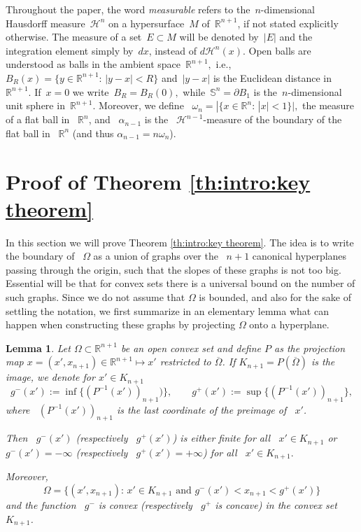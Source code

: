 \documentclass[reqno,12pt]{amsart}
\newcommand{\R}{\mathbb{R}}
\newcommand{\Haus}{\mathcal{H}}
\numberwithin{equation}{section}
\theoremstyle{plain}
\newtheorem{lemma}[definition]{Lemma}
\theoremstyle{definition}
\begin{document}
Throughout the paper, the word \emph{measurable} refers to the~$n$-dimensional Hausdorff measure~$\mathcal{H}^n$ on a hypersurface~$M$ of~$\R^{n+1}$, if not stated explicitly otherwise. The measure of a set~$E \subset M$ will be denoted by~$|E|$ and the integration element simply by~$dx$, instead of $d\Haus^n(x).$ Open balls are understood as balls in the ambient space~$\R^{n+1},$ i.e.,~$B_R(x)=\{y\in \R^{n+1}:\,|y-x|<R\}$ and~$|y-x|$ is the Euclidean distance in~$\R^{n+1}.$ If~$x=0$ we write~$B_R=B_R(0),$ while~$\mathbb{S}^n = \partial B_1$ is the~$n$-dimensional unit sphere in~$\R^{n+1}.$ Moreover, we define ~$\omega_n=|\{x\in\R^n:\,|x|<1\}|,$ the measure of a flat ball in ~$\R^n$, and ~$\alpha_{n-1}$ is the ~$\mathcal{H}^{n-1}$-measure of the boundary of the flat ball in ~$\R^n$ (and thus $\alpha_{n-1}=n\omega_n$).



\section{Proof of Theorem \ref{th:intro:key theorem}}

In this section we will prove Theorem \ref{th:intro:key theorem}. The idea is to write the boundary of ~$\Omega$ as a union of  graphs over the ~$n+1$ canonical hyperplanes passing through the origin, such that the slopes of these graphs is not too big. Essential will be that for convex sets there is a universal bound on the number of such graphs. Since we do not assume that $\Omega$ is bounded, and also for the sake of settling the notation, we first summarize in an elementary lemma what can happen when constructing these graphs by projecting $\Omega$ onto a hyperplane.

\begin{lemma}
  \label{lemma:projection}
   Let  $\Omega\subset\R^{n+1}$ be an open convex set and define $P$ as the projection map $x=(x',x_{n+1})\in\R^{n+1}\mapsto x'$ restricted to $\overline{\Omega}$. If $K_{n+1}=P(\overline{\Omega})$ is the image, we denote for $x'\in K_{n+1}$
   $$
     g^{-}(x'):=\inf\{(P^{-1}(x'))_{n+1})\},\qquad g^+(x'):=\sup\{(P^{-1}(x'))_{n+1}\},
   $$
    where ~$(P^{-1}(x'))_{n+1}$ is the last coordinate of the preimage of ~$x'$.
   
   Then ~$g^-(x')$ (respectively ~$g^+(x')$) is either finite for all ~$x'\in K_{n+1}$ or ~$g^-(x')=-\infty$ (respectively ~$g^+(x')=+\infty$) for all ~$x'\in K_{n+1}.$

   Moreover,  
   $$
     \Omega=\{(x',x_{n+1}):\, x'\in K_{n+1}\text{ and }g^-(x')<x_{n+1}<g^+(x')\}
    $$
    and the function ~$g^-$ is convex (respectively ~$g^+$ is concave) in the convex set ~$K_{n+1}$.
\end{lemma}
\end{document}
